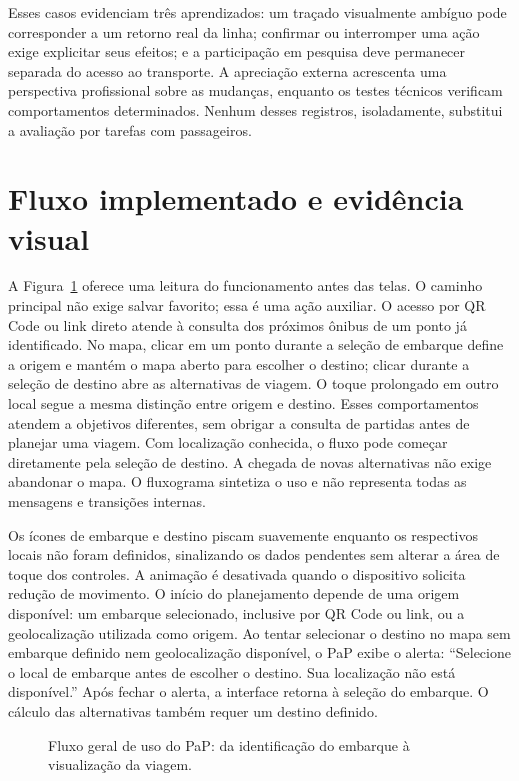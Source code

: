 \documentclass[12pt,oneside,a4paper,brazil,chapter=TITLE]{abntex2}
\let\papsection\section
\renewcommand{\section}{\clearpage\papsection}
\begin{document}
Esses casos evidenciam três aprendizados: um traçado visualmente ambíguo pode corresponder a um retorno real da linha; confirmar ou interromper uma ação exige explicitar seus efeitos; e a participação em pesquisa deve permanecer separada do acesso ao transporte. A apreciação externa acrescenta uma perspectiva profissional sobre as mudanças, enquanto os testes técnicos verificam comportamentos determinados. Nenhum desses registros, isoladamente, substitui a avaliação por tarefas com passageiros.

\section{Fluxo implementado e evidência visual}\label{sec:fluxo-implementado}
A Figura~\ref{fig:fluxo-pap} oferece uma leitura do funcionamento antes das telas. O caminho principal não exige salvar favorito; essa é uma ação auxiliar. O acesso por QR Code ou link direto atende à consulta dos próximos ônibus de um ponto já identificado. No mapa, clicar em um ponto durante a seleção de embarque define a origem e mantém o mapa aberto para escolher o destino; clicar durante a seleção de destino abre as alternativas de viagem. O toque prolongado em outro local segue a mesma distinção entre origem e destino. Esses comportamentos atendem a objetivos diferentes, sem obrigar a consulta de partidas antes de planejar uma viagem. Com localização conhecida, o fluxo pode começar diretamente pela seleção de destino. A chegada de novas alternativas não exige abandonar o mapa. O fluxograma sintetiza o uso e não representa todas as mensagens e transições internas.

Os ícones de embarque e destino piscam suavemente enquanto os respectivos locais não foram definidos, sinalizando os dados pendentes sem alterar a área de toque dos controles. A animação é desativada quando o dispositivo solicita redução de movimento. O início do planejamento depende de uma origem disponível: um embarque selecionado, inclusive por QR Code ou link, ou a geolocalização utilizada como origem. Ao tentar selecionar o destino no mapa sem embarque definido nem geolocalização disponível, o PaP exibe o alerta: ``Selecione o local de embarque antes de escolher o destino. Sua localização não está disponível.'' Após fechar o alerta, a interface retorna à seleção do embarque. O cálculo das alternativas também requer um destino definido.

\begin{figure}[H]
\centering

\caption{Fluxo geral de uso do PaP: da identificação do embarque à visualização da viagem.}\label{fig:fluxo-pap}
\end{figure}
\end{document}
